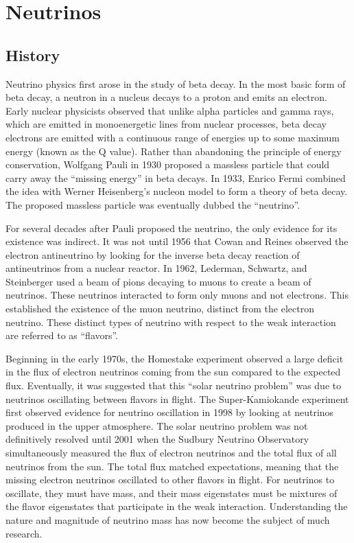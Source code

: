 \documentclass[herrin-thesis.tex]{subfiles}
\begin{document}
\chapter{Neutrinos}
\label{ch:neutrinos}

\section{History}
Neutrino physics first arose in the study of beta decay. In the most basic form of beta decay, a neutron in a nucleus decays to a proton and emits an electron. Early nuclear physicists observed that unlike alpha particles and gamma rays, which are emitted in monoenergetic lines from nuclear processes, beta decay electrons are emitted with a continuous range of energies up to some maximum energy (known as the Q value). Rather than abandoning the principle of energy conservation, Wolfgang Pauli in 1930 proposed a massless particle that could carry away the ``missing energy'' in beta decays. In 1933, Enrico Fermi \cite{Fermi:1934bh} combined the idea with Werner Heisenberg's nucleon model to form a theory of beta decay. The proposed massless particle was eventually dubbed the ``neutrino''.

For several decades after Pauli proposed the neutrino, the only evidence for its existence was indirect. It was not until 1956 that Cowan and Reines \cite{Cowan:1956qf} observed the electron antineutrino by looking for the inverse beta decay reaction of antineutrinos from a nuclear reactor. In 1962, Lederman, Schwartz, and Steinberger \cite{Danby:1962ve} used a beam of pions decaying to muons to create a beam of neutrinos. These neutrinos interacted to form only muons and not electrons. This established the existence of the muon neutrino, distinct from the electron neutrino. These distinct types of neutrino with respect to the weak interaction are referred to as ``flavors''.

Beginning in the early 1970s, the Homestake experiment \cite{Cleveland:1998ly} observed a large deficit in the flux of electron neutrinos coming from the sun compared to the expected flux. Eventually, it was suggested that this ``solar neutrino problem'' was due to neutrinos oscillating between flavors in flight. The Super-Kamiokande experiment first observed evidence for neutrino oscillation in 1998 \cite{Fukuda:1998zr} by looking at neutrinos produced in the upper atmosphere. The solar neutrino problem was not definitively resolved until 2001 when the Sudbury Neutrino Observatory \cite{Ahmad:2001ys} simultaneously measured the flux of electron neutrinos and the total flux of all neutrinos from the sun. The total flux matched expectations, meaning that the missing electron neutrinos oscillated to other flavors in flight. For neutrinos to oscillate, they must have mass, and their mass eigenstates must be mixtures of the flavor eigenstates that participate in the weak interaction. Understanding the nature and magnitude of neutrino mass has now become the subject of much research.
\end{document}
